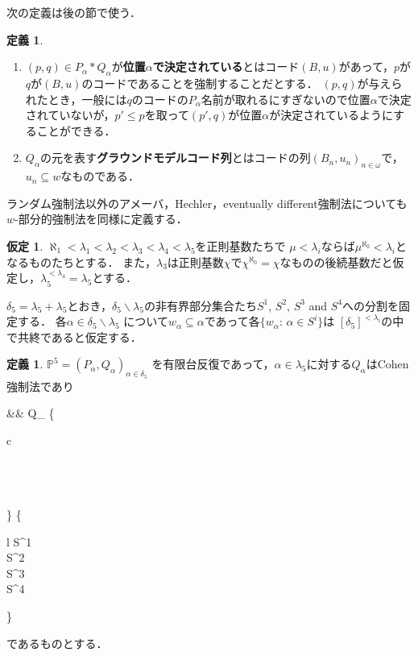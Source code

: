 \documentclass[uplatex,dvipdfmx]{jsarticle}
\newcommand{\Pa}{\mathbb{P}^5}
\renewcommand\subset{\subseteq}
\renewcommand{\setminus}{\smallsetminus}
\theoremstyle{definition}
\newtheorem{defi}[thm]{定義}
\newtheorem{assumption}[thm]{仮定}
\begin{document}
	次の定義は後の節で使う．

	\begin{defi}
		\begin{enumerate}
			\item $(p, q) \in P_\alpha \ast Q_\alpha$が\textbf{位置$\alpha$で決定されている}とはコード$(B, u)$があって，$p$が$q$が$(B,u)$のコードであることを強制することだとする．
			$(p, q)$が与えられたとき，一般には$q$のコードの$P_\alpha$名前が取れるにすぎないので位置$\alpha$で決定されていないが，$p' \le p$を取って$(p', q)$が位置$\alpha$が決定されているようにすることができる．
			
			\item $Q_\alpha$の元を表す\textbf{グラウンドモデルコード列}とはコードの列$(B_n, u_n)_{n \in \omega}$で，$u_n \subset w$なものである．
		\end{enumerate}
	\end{defi}

	ランダム強制法以外のアメーバ，Hechler，eventually different強制法についても$w$-部分的強制法を同様に定義する．
	
	\begin{assumption}\label{asm:P}
		$\aleph_1<\lambda_1<\lambda_2<\lambda_3<\lambda_4<\lambda_5$を正則基数たちで
		$\mu<\lambda_i$ならば$\mu^{\aleph_0}<\lambda_i$となるものたちとする．
		また，$\lambda_3$は正則基数$\chi$で$\chi^{\aleph_0}=\chi$なものの後続基数だと仮定し，$\lambda_5^{<\lambda_4}=\lambda_5$とする．
		
		$\delta_5=\lambda_5+\lambda_5$とおき，$\delta_5\setminus\lambda_5$の非有界部分集合たち$S^1$, $S^2$, $S^3$ and $S^4$への分割を固定する．
		各$\alpha\in \delta_5\setminus\lambda_5$ について$w_\alpha\subseteq \alpha$であって各$\{w_\alpha:\, \alpha\in S^i\}$は $[\delta_5]^{{<}\lambda_i}$の中で共終であると仮定する．
	\end{assumption}
	
	\begin{defi}\label{def:Pa}
		$\Pa=(P_\alpha,Q_\alpha)_{\alpha\in\delta_5}$ 
		を有限台反復であって，$\alpha\in \lambda_5$に対する$Q_\alpha$はCohen強制法であり
		\begin{flalign*}
			&&
			Q_\alpha\text{ は$w_\alpha$-部分的 }
			\left\{
			\begin{array}{c}
				\\
				\\
				\\
				\\
			\end{array}\right\}
			 \hspace{0.5cm} \text{($\alpha$が}
			\left\{
			\begin{array}{l}
				S^1\\
				S^2\\
				S^3\\
				S^4\\
			\end{array}
			\right\} 
			\\
		\end{flalign*}
		であるものとする．
	\end{defi}
\end{document}
